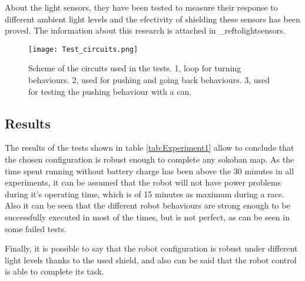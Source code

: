 About the light sensors, they have been tested to measure their response to different ambient light levels and the efectivity of shielding these sensors has been proved.
The information about this research is attached in \_reftolightsensors.


\begin{figure}[H]
\texttt{[image: Test\_circuits.png]}
\centering
\caption{Scheme of the circuits used in the tests. 1, loop for turning behaviours. 2, used for pushing and going back behaviours. 3, used for testing the pushing behaviour with a can. }
\label{fig:testMaps}
\end{figure}


\subsection{Results}
	The results of the tests shown in table \ref{tab:Experiment1} allow to conclude that the chosen configuration is robust enough to complete any sokoban map.
	As the time spent running without battery charge has been above the 30 minutes in all experiments, it can be assumed that the robot will not have power problems during it's operating time, which is of 15 minutes as maximum during a race.
	Also it can be seen that the different robot behaviours are strong enough to be successfully executed in most of the times, but is not perfect, as can be seen in some failed tests.
	
	Finally, it is possible to say that the robot configuration is robust under different light levels thanks to the used shield, and also can be said that the robot control is able to complete its task.


